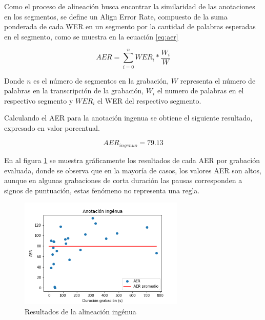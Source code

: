 Como el proceso de alineación busca encontrar la similaridad de las anotaciones en los segmentos, se define un Align Error Rate, compuesto de la suma ponderada de cada WER en un segmento por la cantidad de palabras esperadas en el segmento, como se muestra en la ecuación \ref{eq:aer}




\begin{equation}
    \label{eq:aer}
    AER = \sum_{i=0}^{n}{WER_i * \frac{W_i}{W}}
\end{equation}

Donde $n$ es el número de segmentos en la grabación, $W$ representa el número de palabras en la transcripción de la grabación, $W_i$ el numero de palabras en el respectivo segmento y $WER_i$ el WER del respectivo segmento.

Calculando el AER para la anotación ingenua se obtiene el siguiente resultado, expresado en valor porcentual.

\begin{equation}
    AER_{ingenuo} = 79.13
\end{equation}

En al figura \ref{img:aer_ingenuo} se muestra gráficamente los resultados de cada AER por grabación evaluada, donde se observa que en la mayoría de casos, los valores AER son altos, aunque en algunas grabaciones de corta duración las pausas corresponden a signos de puntuación, estas fenómeno no representa una regla.

\begin{figure}[H]
\caption{Resultados de la alineación ingénua}
\label{img:aer_ingenuo}
\begin{center}
\includegraphics[width=0.7\textwidth]{imagenes/04_01_aer_ingenuo.png}
\end{center}
\end{figure}

